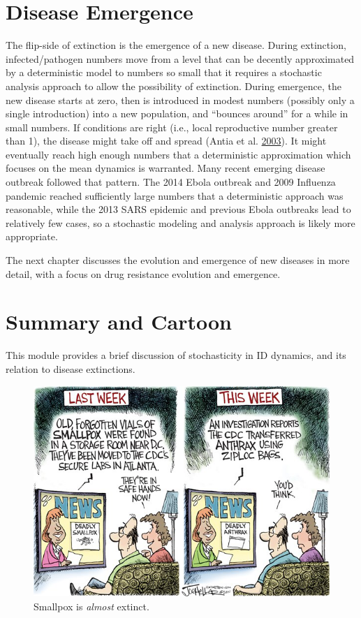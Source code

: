 \documentclass[]{book}
\theoremstyle{definition}
\theoremstyle{definition}
\theoremstyle{definition}
\theoremstyle{remark}
\begin{document}
\section{Disease Emergence}\label{disease-emergence}

The flip-side of extinction is the emergence of a new disease. During
extinction, infected/pathogen numbers move from a level that can be
decently approximated by a deterministic model to numbers so small that
it requires a stochastic analysis approach to allow the possibility of
extinction. During emergence, the new disease starts at zero, then is
introduced in modest numbers (possibly only a single introduction) into
a new population, and ``bounces around'' for a while in small numbers.
If conditions are right (i.e., local reproductive number greater than
1), the disease might take off and spread (Antia et al.
\protect\hyperlink{ref-antia03}{2003}). It might eventually reach high
enough numbers that a deterministic approximation which focuses on the
mean dynamics is warranted. Many recent emerging disease outbreak
followed that pattern. The 2014 Ebola outbreak and 2009 Influenza
pandemic reached sufficiently large numbers that a deterministic
approach was reasonable, while the 2013 SARS epidemic and previous Ebola
outbreaks lead to relatively few cases, so a stochastic modeling and
analysis approach is likely more appropriate.

The next chapter discusses the evolution and emergence of new diseases
in more detail, with a focus on drug resistance evolution and emergence.

\section{Summary and Cartoon}\label{summary-and-cartoon-12}

This module provides a brief discussion of stochasticity in ID dynamics,
and its relation to disease extinctions.

\begin{figure}
\centering
\includegraphics{./images/smallpox.png}
\caption{\label{fig:smallpox}Smallpox is \emph{almost} extinct.}
\end{figure}
\end{document}
